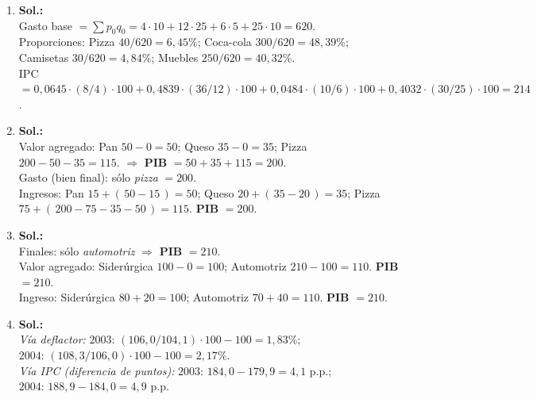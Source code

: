 \documentclass[11pt,addpoints]{article}
\begin{document}
\begin{enumerate}
\bigskip

\item \textbf{Sol.:}\\
Gasto base $=\sum p_0 q_0= 4\cdot10+12\cdot25+6\cdot5+25\cdot10=620$.\\
Proporciones: Pizza $40/620=6{,}45\%$;\; Coca-cola $300/620=48{,}39\%$;\; Camisetas $30/620=4{,}84\%$;\; Muebles $250/620=40{,}32\%$.\\
IPC $=0{,}0645\cdot(8/4)\cdot100+0{,}4839\cdot(36/12)\cdot100+0{,}0484\cdot(10/6)\cdot100+0{,}4032\cdot(30/25)\cdot100=214$.

\bigskip

\item \textbf{Sol.:}\\
Valor agregado: Pan $50-0=50$; Queso $35-0=35$; Pizza $200-50-35=115$. \; $\Rightarrow$ \textbf{PIB} $=50+35+115=200$.\\
Gasto (bien final): sólo \textit{pizza} $=200$.\\
Ingresos: Pan $15+(\,50-15\,)=50$; Queso $20+(\,35-20\,)=35$; Pizza $75+(\,200-75-35-50\,)=115$. \; \textbf{PIB} $=200$.

\bigskip
\newpage
\vspace*{0.03cm} %

\item \textbf{Sol.:}\\
Finales: sólo \textit{automotriz} $\Rightarrow$ \textbf{PIB} $=210$.\\
Valor agregado: Siderúrgica $100-0=100$;\; Automotriz $210-100=110$.\; \textbf{PIB} $=210$.\\
Ingreso: Siderúrgica $80+20=100$;\; Automotriz $70+40=110$.\; \textbf{PIB} $=210$.

\bigskip

\item \textbf{Sol.:}\\
\textit{Vía deflactor:}\; $2003:\,(106{,}0/104{,}1)\cdot100-100=1{,}83\%$;\; $2004:\,(108{,}3/106{,}0)\cdot100-100=2{,}17\%$.\\
\textit{Vía IPC (diferencia de puntos):}\; $2003:\,184{,}0-179{,}9=4{,}1$ p.p.;\; $2004:\,188{,}9-184{,}0=4{,}9$ p.p.

\bigskip


\end{enumerate}
\end{document}
